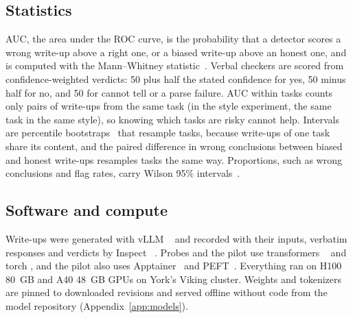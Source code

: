 \subsection{Statistics}
\label{sec:methods-stats}

AUC, the area under the ROC curve, is the probability that a detector scores a wrong write-up above a right one, or a biased write-up above an honest one, and is computed with the Mann--Whitney statistic~\cite{hanley1982auc}. Verbal checkers are scored from confidence-weighted verdicts: 50 plus half the stated confidence for yes, 50 minus half for no, and 50 for cannot tell or a parse failure. AUC within tasks counts only pairs of write-ups from the same task (in the style experiment, the same task in the same style), so knowing which tasks are risky cannot help. Intervals are percentile bootstraps~\cite{efron1994bootstrap} that resample tasks, because write-ups of one task share its content, and the paired difference in wrong conclusions between biased and honest write-ups resamples tasks the same way. Proportions, such as wrong conclusions and flag rates, carry Wilson 95\% intervals~\cite{wilson1927}.

\subsection{Software and compute}
\label{sec:methods-software}

Write-ups were generated with vLLM ~\cite{kwon2023vllm} and recorded with their inputs, verbatim responses and verdicts by Inspect ~\cite{inspect2024}. Probes and the pilot use transformers ~\cite{wolf2020transformers} and torch , and the pilot also uses Apptainer~\cite{apptainer2021} and PEFT~\cite{peft2022}. Everything ran on H100 80~GB and A40 48~GB GPUs on York's Viking cluster. Weights and tokenizers are pinned to downloaded revisions and served offline without code from the model repository (Appendix~\ref{app:models}).
